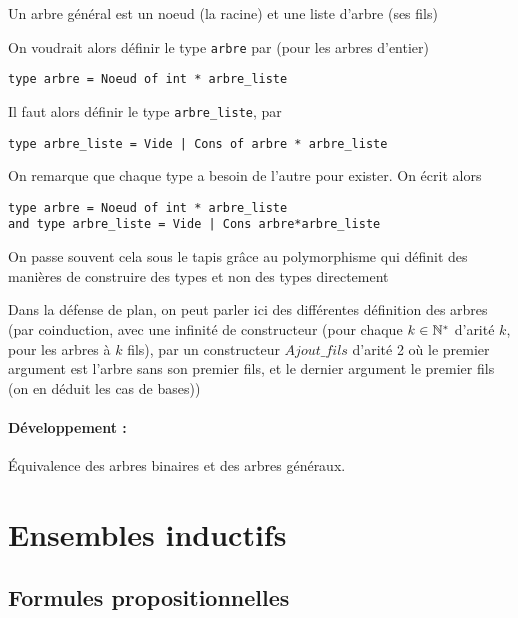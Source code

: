 \begin{definition}
	Un arbre général est un noeud (la racine) et une liste d'arbre (ses fils)
\end{definition}

On voudrait alors définir le type \texttt{arbre} par (pour les arbres d'entier)
\begin{lstlisting}
type arbre = Noeud of int * arbre_liste
\end{lstlisting}
Il faut alors définir le type \texttt{arbre\_liste}, par
\begin{lstlisting}
type arbre_liste = Vide | Cons of arbre * arbre_liste
\end{lstlisting}

On remarque que chaque type a besoin de l'autre pour exister. On écrit alors
\begin{lstlisting}
type arbre = Noeud of int * arbre_liste
and type arbre_liste = Vide | Cons arbre*arbre_liste
\end{lstlisting}

\begin{rem}
	On passe souvent cela sous le tapis grâce au polymorphisme qui définit des manières de construire des types et non des types directement
\end{rem}

\begin{com}
	Dans la défense de plan, on peut parler ici des différentes définition des arbres (par coinduction, avec une infinité de constructeur (pour chaque $k \in \mathbb{N}^*$ d'arité $k$, pour les arbres à $k$ fils), par un constructeur $Ajout\_fils$ d'arité 2 où le premier argument est l'arbre sans son premier fils, et le dernier argument le premier fils (on en déduit les cas de bases))
\end{com}

\paragraph{Développement :} Équivalence des arbres binaires et des arbres généraux.

\section{Ensembles inductifs}

\subsection{Formules propositionnelles}

